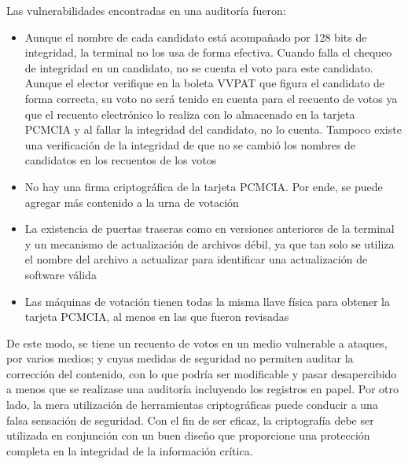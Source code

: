 Las vulnerabilidades encontradas en una auditoría fueron:
\begin{itemize}
	\item Aunque el nombre de cada candidato está acompañado por 128 bits de integridad, la terminal no los usa de forma efectiva. Cuando falla el chequeo de integridad en un candidato, no se cuenta el voto para este candidato. Aunque el elector verifique en la boleta VVPAT que figura el candidato de forma correcta, su voto no será tenido en cuenta para el recuento de votos ya que el recuento electrónico lo realiza con lo almacenado en la tarjeta PCMCIA y al fallar la integridad del candidato, no lo cuenta. Tampoco existe una verificación de la integridad de que no se cambió los nombres de candidatos en los recuentos de los votos
	\item No hay una firma criptográfica de la tarjeta PCMCIA. Por ende, se puede agregar más contenido a la urna de votación
	\item La existencia de puertas traseras como en versiones anteriores de la terminal y un mecanismo de actualización de archivos débil, ya que tan solo se utiliza el nombre del archivo a actualizar para identificar una actualización de software válida
	\item Las máquinas de votación tienen todas la misma llave física para obtener la tarjeta PCMCIA, al menos en las que fueron revisadas
\end{itemize}

De este modo, se tiene un recuento de votos en un medio vulnerable a ataques, por varios medios; y cuyas medidas de seguridad no permiten auditar la corrección del contenido, con lo que podría ser modificable y pasar desapercibido a menos que se realizase una auditoría incluyendo los registros en papel. Por otro lado, la mera utilización de herramientas criptográficas puede conducir a una falsa sensación de seguridad. Con el fin de ser eficaz, la criptografía debe ser utilizada en conjunción con un buen diseño que proporcione una protección completa en la integridad de la información crítica.

